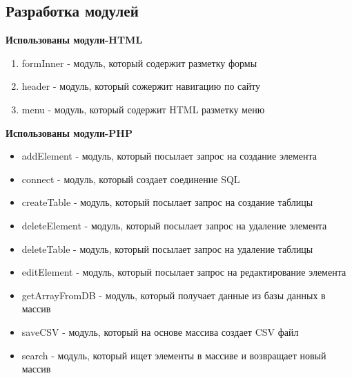 \newpage


\subsection{Разработка модулей}

\textbf{Использованы модули-HTML}
\begin{enumerate}
    \item formInner - модуль, который содержит разметку формы
    \item header - модуль, который сожержит навигацию по сайту
    \item menu - модуль, который содержит HTML разметку меню
\end{enumerate}

\textbf{Использованы модули-PHP}
\begin{itemize}
    \item addElement - модуль, который посылает запрос на создание элемента
    \item connect - модуль, который создает соединение SQL
    \item createTable - модуль, который посылает запрос на создание таблицы
    \item deleteElement - модуль, который посылает запрос на удаление элемента
    \item deleteTable - модуль, который посылает запрос на удаление таблицы
    \item editElement - модуль, который посылает запрос на редактирование элемента
    \item getArrayFromDB - модуль, который получает данные из базы данных в массив
    \item saveCSV - модуль, который на основе массива создает CSV файл
    \item search - модуль, который ищет элементы в массиве и возвращает новый массив
\end{itemize}

\newpage